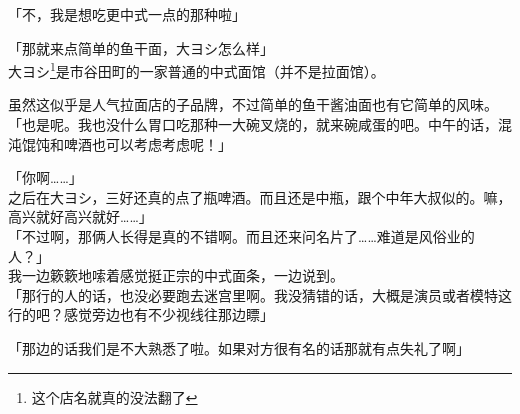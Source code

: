 「不，我是想吃更中式一点的那种啦」

「那就来点简单的鱼干面，大ヨシ怎么样」\\

大ヨシ\footnote{这个店名就真的没法翻了}是市谷田町的一家普通的中式面馆（并不是拉面馆）。

虽然这似乎是人气拉面店的子品牌，不过简单的鱼干酱油面也有它简单的风味。\\

「也是呢。我也没什么胃口吃那种一大碗叉烧的，就来碗咸蛋的吧。中午的话，混沌馄饨和啤酒也可以考虑考虑呢！」

「你啊……」\\

之后在大ヨシ，三好还真的点了瓶啤酒。而且还是中瓶，跟个中年大叔似的。嘛，高兴就好高兴就好……」\\

「不过啊，那俩人长得是真的不错啊。而且还来问名片了……难道是风俗业的人？」\\

我一边簌簌地嗦着感觉挺正宗的中式面条，一边说到。\\

「那行的人的话，也没必要跑去迷宫里啊。我没猜错的话，大概是演员或者模特这行的吧？感觉旁边也有不少视线往那边瞟」

「那边的话我们是不大熟悉了啦。如果对方很有名的话那就有点失礼了啊」

